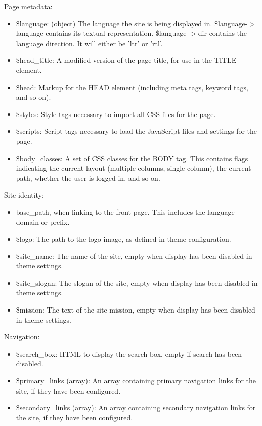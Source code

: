 Page metadata:\begin{itemize}
\item \$language: (object) The language the site is being displayed in. \$language-$>$language contains its textual representation. \$language-$>$dir contains the language direction. It will either be 'ltr' or 'rtl'.\item \$head\_\-title: A modified version of the page title, for use in the TITLE element.\item \$head: Markup for the HEAD element (including meta tags, keyword tags, and so on).\item \$styles: Style tags necessary to import all CSS files for the page.\item \$scripts: Script tags necessary to load the JavaScript files and settings for the page.\item \$body\_\-classes: A set of CSS classes for the BODY tag. This contains flags indicating the current layout (multiple columns, single column), the current path, whether the user is logged in, and so on.\end{itemize}


Site identity:\begin{itemize}
\item {}
base\_\-path, when linking to the front page. This includes the language domain or prefix.\item \$logo: The path to the logo image, as defined in theme configuration.\item \$site\_\-name: The name of the site, empty when display has been disabled in theme settings.\item \$site\_\-slogan: The slogan of the site, empty when display has been disabled in theme settings.\item \$mission: The text of the site mission, empty when display has been disabled in theme settings.\end{itemize}


Navigation:\begin{itemize}
\item \$search\_\-box: HTML to display the search box, empty if search has been disabled.\item \$primary\_\-links (array): An array containing primary navigation links for the site, if they have been configured.\item \$secondary\_\-links (array): An array containing secondary navigation links for the site, if they have been configured.\end{itemize}


